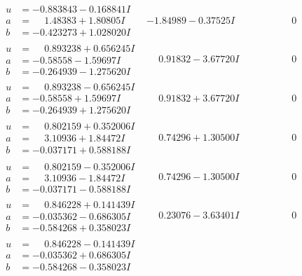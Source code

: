 \documentclass[1p]{elsarticle_modified}
\theoremstyle{definition}
\begin{document}
$$\begin{array}{c|c|c}
\begin{aligned}
u &= -0.883843 - 0.168841 I \\
a &= \phantom{-}1.48383 + 1.80805 I \\
b &= -0.423273 + 1.028020 I\end{aligned}
 & -1.84989 - 0.37525 I & \phantom{-0.000000 } 0 \\ \hline\begin{aligned}
u &= \phantom{-}0.893238 + 0.656245 I \\
a &= -0.58558 - 1.59697 I \\
b &= -0.264939 - 1.275620 I\end{aligned}
 & \phantom{-}0.91832 - 3.67720 I & \phantom{-0.000000 } 0 \\ \hline\begin{aligned}
u &= \phantom{-}0.893238 - 0.656245 I \\
a &= -0.58558 + 1.59697 I \\
b &= -0.264939 + 1.275620 I\end{aligned}
 & \phantom{-}0.91832 + 3.67720 I & \phantom{-0.000000 } 0 \\ \hline\begin{aligned}
u &= \phantom{-}0.802159 + 0.352006 I \\
a &= \phantom{-}3.10936 + 1.84472 I \\
b &= -0.037171 + 0.588188 I\end{aligned}
 & \phantom{-}0.74296 + 1.30500 I & \phantom{-0.000000 } 0 \\ \hline\begin{aligned}
u &= \phantom{-}0.802159 - 0.352006 I \\
a &= \phantom{-}3.10936 - 1.84472 I \\
b &= -0.037171 - 0.588188 I\end{aligned}
 & \phantom{-}0.74296 - 1.30500 I & \phantom{-0.000000 } 0 \\ \hline\begin{aligned}
u &= \phantom{-}0.846228 + 0.141439 I \\
a &= -0.035362 - 0.686305 I \\
b &= -0.584268 + 0.358023 I\end{aligned}
 & \phantom{-}0.23076 - 3.63401 I & \phantom{-0.000000 } 0 \\ \hline\begin{aligned}
u &= \phantom{-}0.846228 - 0.141439 I \\
a &= -0.035362 + 0.686305 I \\
b &= -0.584268 - 0.358023 I\end{aligned}

\end{array}$$
\end{document}
